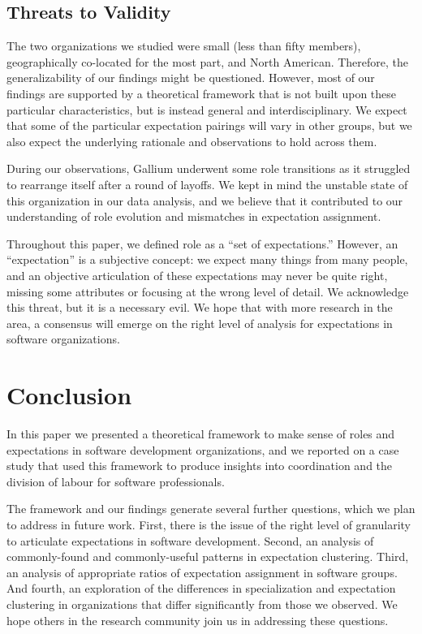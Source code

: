 \documentclass[10pt, conference, compsocconf]{IEEEtran}
\begin{document}
\subsection{Threats to Validity}

The two organizations we studied were small (less than fifty members), geographically co-located for the most part, and North American. Therefore, the generalizability of our findings might be questioned. However, most of our findings are supported by a theoretical framework that is not built upon these particular characteristics, but is instead general and interdisciplinary. We expect that some of the particular expectation pairings will vary in other groups, but we also expect the underlying rationale and observations to hold across them.

During our observations, Gallium underwent some role transitions as it struggled to rearrange itself after a round of layoffs. We kept in mind the unstable state of this organization in our data analysis, and we believe that it contributed to our understanding of role evolution and mismatches in expectation assignment.

Throughout this paper, we defined role as a ``set of expectations.'' However, an ``expectation'' is a subjective concept: we expect many things from many people, and an objective articulation of these expectations may never be quite right, missing some attributes or focusing at the wrong level of detail. We acknowledge this threat, but it is a necessary evil. We hope that with more research in the area, a consensus will emerge on the right level of analysis for expectations in software organizations.




\section{Conclusion}

In this paper we presented a theoretical framework to make sense of roles and expectations in software development organizations, and we reported on a case study that used this framework to produce insights into coordination and the division of labour for software professionals.

The framework and our findings generate several further questions, which we plan to address in future work. First, there is the issue of the right level of granularity to articulate expectations in software development. Second, an analysis of commonly-found and commonly-useful patterns in expectation clustering. Third, an analysis of  appropriate ratios of expectation assignment in software groups. And fourth, an exploration of the differences in specialization and expectation clustering in organizations that differ significantly from those we observed. We hope others in the research community join us in addressing these questions.
\end{document}
